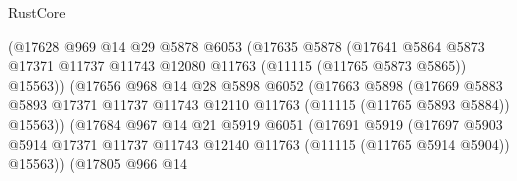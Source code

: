 \begin{lexlean}{RustCore}
\begin{coremodule}
                                (@17628
                                  @969
                                  @14
                                  @29
                                  @5878
                                  @6053
                                  (@17635
                                    @5878
                                    (@17641
                                      @5864
                                      @5873
                                      @17371
                                      @11737
                                      @11743
                                      @12080
                                      @11763
                                      (@11115 (@11765 @5873 @5865))
                                      @15563))
                                  (@17656
                                    @968
                                    @14
                                    @28
                                    @5898
                                    @6052
                                    (@17663
                                      @5898
                                      (@17669
                                        @5883
                                        @5893
                                        @17371
                                        @11737
                                        @11743
                                        @12110
                                        @11763
                                        (@11115 (@11765 @5893 @5884))
                                        @15563))
                                    (@17684
                                      @967
                                      @14
                                      @21
                                      @5919
                                      @6051
                                      (@17691
                                        @5919
                                        (@17697
                                          @5903
                                          @5914
                                          @17371
                                          @11737
                                          @11743
                                          @12140
                                          @11763
                                          (@11115 (@11765 @5914 @5904))
                                          @15563))
                                      (@17805
                                        @966
                                        @14

\end{coremodule}
\end{lexlean}
